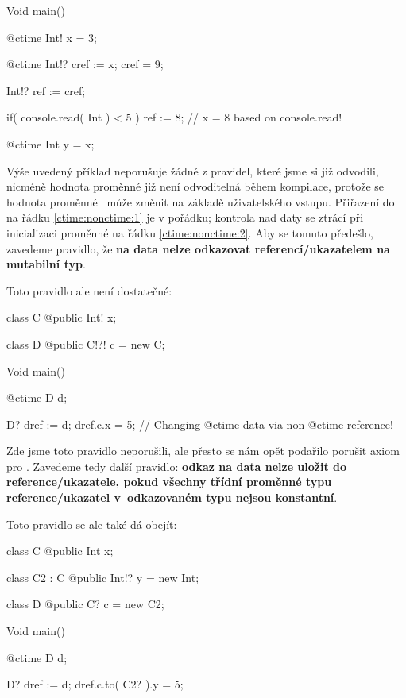 \begin{code}[\label{ctime:nonctime:3}]
Void main() {
	@ctime Int! x = 3;
	
	@ctime Int!? cref := x;
	cref = 9; $\label{ctime:nonctime:1}$
	
	Int!? ref := cref; $\label{ctime:nonctime:2}$
	
	if( console.read( Int ) < 5 )
		ref := 8; // x = 8 based on console.read!
		
	@ctime Int y = x;
}
\end{code}

Výše uvedený příklad neporušuje žádné z pravidel, které jsme si již odvodili, nicméně hodnota proměnné  již není odvoditelná během kompilace, protože se hodnota proměnné ~může změnit na základě uživatelského vstupu. Přiřazení do  na řádku \ref{ctime:nonctime:1} je v pořádku; kontrola nad daty se ztrácí při inicializaci proměnné  na řádku \ref{ctime:nonctime:2}. Aby se tomuto předešlo, zavedeme pravidlo, že \textbf{na \ctime data nelze odkazovat \nonctime referencí/ukazatelem na mutabilní typ}.

Toto pravidlo ale není dostatečné:

\begin{code}
class C {
	@public Int! x;
}

class D {
	@public C!?! c = new C;
}

Void main() {
	@ctime D d;
	
	D? dref := d;
	dref.c.x = 5; // Changing @ctime data via non-@ctime reference!
}
\end{code}

Zde jsme toto pravidlo neporušili, ale přesto se nám opět podařilo porušit axiom pro \ctime. Zavedeme tedy další pravidlo: \textbf{odkaz na \ctime data nelze uložit do \nonctime reference/ukazatele, pokud všechny třídní proměnné typu reference/ukazatel v~odkazovaném typu nejsou konstantní}.

Toto pravidlo se ale také dá obejít:

\begin{code}
class C {
	@public Int x;
}

class C2 : C {
	@public Int!? y = new Int;
}

class D {
	@public C? c = new C2;
}

Void main() {
	@ctime D d;
	
	D? dref := d;
	dref.c.to( C2? ).y = 5;
}
\end{code}


